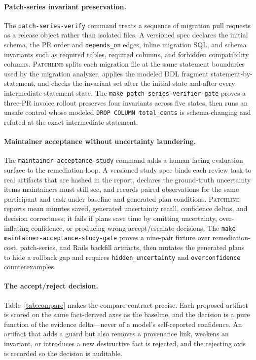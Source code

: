\documentclass[11pt]{article}
\newcommand{\tool}{\textsc{Patchline}}
\newcommand{\code}[1]{\texttt{#1}}
\newcommand{\gate}[1]{\texttt{make #1}}
\begin{document}
\paragraph{Patch-series invariant preservation.} The \code{patch-series-verify} command treats a
sequence of migration pull requests as a release object rather than isolated files. A versioned spec
declares the initial schema, the PR order and \code{depends\_on} edges, inline migration SQL, and schema
invariants such as required tables, required columns, and forbidden compatibility columns. \tool{}
splits each migration file at the same statement boundaries used by the migration analyzer, applies the
modeled DDL fragment statement-by-statement, and checks the invariant set after the initial state and
after every intermediate statement state. The \gate{patch-series-verifier-gate} proves a three-PR
invoice rollout preserves four invariants across five states, then runs an unsafe control whose modeled
\code{DROP COLUMN total\_cents} is schema-changing and refuted at the exact intermediate statement.

\paragraph{Maintainer acceptance without uncertainty laundering.} The
\code{maintainer-acceptance-study} command adds a human-facing evaluation surface to the remediation
loop. A versioned study spec binds each review task to real artifacts that are hashed in the report,
declares the ground-truth uncertainty items maintainers must still see, and records paired observations
for the same participant and task under baseline and generated-plan conditions. \tool{} reports mean
minutes saved, generated uncertainty recall, confidence deltas, and decision correctness; it fails if
plans save time by omitting uncertainty, over-inflating confidence, or producing wrong accept/escalate
decisions. The \gate{maintainer-acceptance-study-gate} proves a nine-pair fixture over remediation-cost,
patch-series, and Rails backfill artifacts, then mutates the generated plans to hide a rollback gap and
requires \code{hidden\_uncertainty} and \code{overconfidence} counterexamples.

\paragraph{The accept/reject decision.} Table~\ref{tab:compare} makes the compare contract precise.
Each proposed artifact is scored on the same fact-derived axes as the baseline, and the decision is a
pure function of the evidence delta---never of a model's self-reported confidence. An artifact that
adds a guard but also removes a provenance link, weakens an invariant, or introduces a new destructive
fact is rejected, and the rejecting axis is recorded so the decision is auditable.
\end{document}
